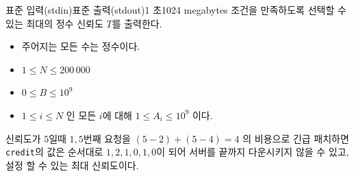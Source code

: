 \begin{problem}{\probtitle}{표준 입력(stdin)}{표준 출력(stdout)}{1 초}{1024 megabytes}
조건을 만족하도록 선택할 수 있는 최대의 정수 신뢰도 $T$를 출력한다.

\newpage

\Constraints

\begin{itemize}[topsep=0pt,noitemsep]
    \item 주어지는 모든 수는 정수이다.
    \item $1 \le N \le 200\,000$
    \item $0 \le B \le 10^9$
    \item $1 \le i \le N $ 인 모든 $i$에 대해 $1 \le A_i \le 10^9$ 이다.
\end{itemize}

\Example

\begin{example}
\end{example}

\Notes
신뢰도가 $5$일때 $1, 5$번째 요청을 $(5-2) + (5-4) = 4$ 의 비용으로 긴급 패치하면 \texttt{credit}의 값은 순서대로 $1, 2, 1, 0, 1, 0$이 되어 서버를 끝까지 다운시키지 않을 수 있고, 설정 할 수 있는 최대 신뢰도이다. 

\end{problem}